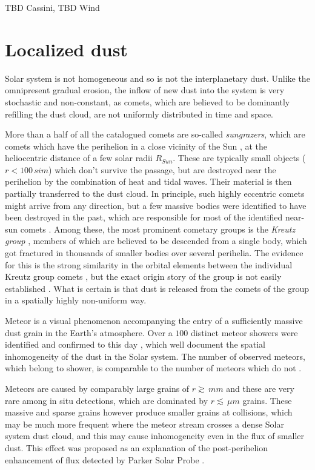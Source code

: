TBD Cassini, TBD Wind

\section{Localized dust}

Solar system is not homogeneous and so is not the interplanetary dust. Unlike the omnipresent gradual erosion, the inflow of new dust into the system is very stochastic and non-constant, as comets, which are believed to be dominantly refilling the dust cloud, are not uniformly distributed in time and space. 

More than a half of all the catalogued comets are so-called \textit{sungrazers}, which are comets which have the perihelion in a close vicinity of the Sun \citep{jones2018science}, at the heliocentric distance of a few solar radii $R_{Sun}$. These are typically small objects ($r<100 \, si{m}$) which don't survive the passage, but are destroyed near the perihelion by the combination of heat and tidal waves. Their material is then partially transferred to the dust cloud. In principle, such highly eccentric comets might arrive from any direction, but a few massive bodies were identified to have been destroyed in the past, which are responsible for most of the identified near-sun comets \citep{jones2018science}. Among these, the most prominent cometary groups is the \textit{Kreutz group} \citep{kreutz1888untersuchungen}, members of which are believed to be descended from a single body, which got fractured in thousands of smaller bodies over several perihelia. The evidence for this is the strong similarity in the orbital elements between the individual Kreutz group comets \citep{jones2018science}, but the exact origin story of the group is not easily established \citep{kalinicheva2017specific,fernandez2021origin}. What is certain is that dust is released from the comets of the group in a spatially highly non-uniform way. 

Meteor is a visual phenomenon accompanying the entry of a sufficiently massive dust grain in the Earth's atmosphere. Over a $100$ distinct meteor showers were identified and confirmed to this day \citep{jenniskens2020removing}, which well document the spatial inhomogeneity of the dust in the Solar system. The number of observed meteors, which belong to shower, is comparable to the number of meteors which do not \citep{jenniskens2016cams}. 

Meteors are caused by comparably large grains of $r \gtrsim \, \si{mm}$ and these are very rare among in situ detections, which are dominated by $r \lesssim \, \si{\mu m}$ grains. These massive and sparse grains however produce smaller grains at collisions, which may be much more frequent where the meteor stream crosses a dense Solar system dust cloud, and this may cause inhomogeneity even in the flux of smaller dust. This effect was proposed as an explanation of the post-perihelion enhancement of flux detected by Parker Solar Probe \citep{szalay2021collisional}.

